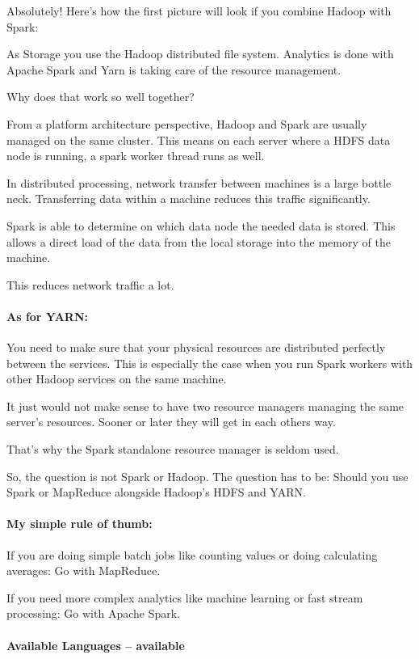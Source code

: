 \documentclass[12pt]{scrartcl} %
\begin{document}
Absolutely! Here’s how the first picture will look if you combine Hadoop with Spark:


As Storage you use the Hadoop distributed file system. Analytics is done with Apache Spark and Yarn is taking care of the resource management.

Why does that work so well together?

From a platform architecture perspective, Hadoop and Spark are usually managed on the same cluster. This means on each server where a HDFS data node is running, a spark worker thread runs as well.

In distributed processing, network transfer between machines is a large bottle neck. Transferring data within a machine reduces this traffic significantly.

Spark is able to determine on which data node the needed data is stored. This allows a direct load of the data from the local storage into the memory of the machine.

This reduces network traffic a lot.

\paragraph{As for YARN:} You need to make sure that your physical resources are distributed perfectly between the services. This is especially the case when you run Spark workers with other Hadoop services on the same machine.

It just would not make sense to have two resource managers managing the same server’s resources. Sooner or later they will get in each others way.

That’s why the Spark standalone resource manager is seldom used.

So, the question is not Spark or Hadoop. The question has to be: Should you use Spark or MapReduce alongside Hadoop’s HDFS and YARN.

\paragraph{My simple rule of thumb:}

If you are doing simple batch jobs like counting values or doing calculating averages: Go with MapReduce.

If you need more complex analytics like machine learning or fast stream processing: Go with Apache Spark.

\paragraph{Available Languages -- available}
\end{document}
